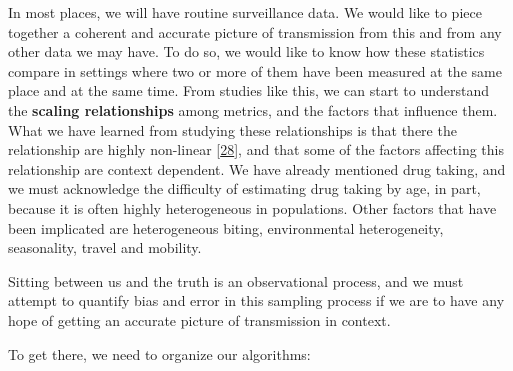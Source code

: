 \documentclass[
]{book}
\begin{document}
In most places, we will have routine surveillance data. We would like to piece together a coherent and accurate picture of transmission from this and from any other data we may have. To do so, we would like to know how these statistics compare in settings where two or more of them have been measured at the same place and at the same time. From studies like this, we can start to understand the \textbf{scaling relationships} among metrics, and the factors that influence them. What we have learned from studying these relationships is that there the relationship are highly non-linear {[}\protect\hyperlink{ref-HaySI2008MeasuringMalaria}{28}{]}, and that some of the factors affecting this relationship are context dependent. We have already mentioned drug taking, and we must acknowledge the difficulty of estimating drug taking by age, in part, because it is often highly heterogeneous in populations. Other factors that have been implicated are heterogeneous biting, environmental heterogeneity, seasonality, travel and mobility.

Sitting between us and the truth is an observational process, and we must attempt to quantify bias and error in this sampling process if we are to have any hope of getting an accurate picture of transmission in context.

To get there, we need to organize our algorithms:
\end{document}

